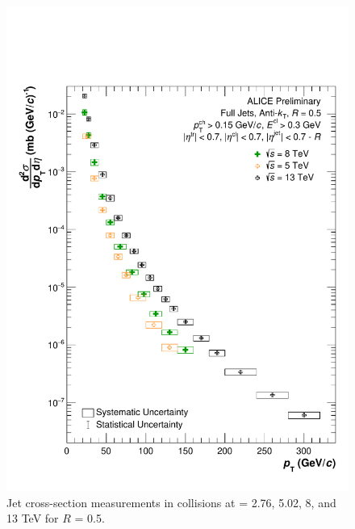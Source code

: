 \begin{figure}[h!]
    \centering
    \includegraphics[width=15cm]{figures/EnergyComparisons/SpectrumComparison_R05.pdf}
    \caption{Jet cross-section measurements in \pp collisions at \s = 2.76, 5.02, 8, and 13 TeV for $R$ = 0.5.}
    \label{fig:appSpecCompareR05}
\end{figure}
\iffalse
